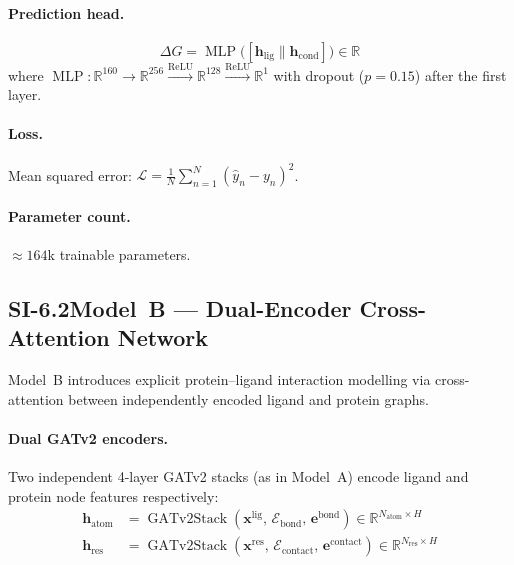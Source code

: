 \documentclass[11pt]{article}
\begin{document}
\paragraph{Prediction head.}
\begin{equation}
  \Delta G = \operatorname{MLP}\!\bigl(
    [\mathbf{h}_{\mathrm{lig}} \| \mathbf{h}_{\mathrm{cond}}]
  \bigr) \in \mathbb{R}
  \label{eq:pred_mlp}
\end{equation}
where $\operatorname{MLP}: \mathbb{R}^{160} \to
\mathbb{R}^{256} \xrightarrow{\mathrm{ReLU}}
\mathbb{R}^{128} \xrightarrow{\mathrm{ReLU}}
\mathbb{R}^{1}$ with dropout ($p = 0.15$) after the first layer.

\paragraph{Loss.} Mean squared error:
$\mathcal{L} = \frac{1}{N}\sum_{n=1}^{N}(\hat{y}_n - y_n)^2$.

\paragraph{Parameter count.} $\approx 164$k trainable parameters.

\subsection*{SI-6.2\quad Model~B --- Dual-Encoder Cross-Attention Network}
\label{si:model_b}

Model~B introduces explicit protein--ligand interaction modelling via
cross-attention between independently encoded ligand and protein graphs.

\paragraph{Dual GATv2 encoders.}
Two independent 4-layer GATv2 stacks (as in Model~A) encode ligand and
protein node features respectively:
\begin{align}
  \mathbf{h}_{\mathrm{atom}} &= \operatorname{GATv2Stack}(
    \mathbf{x}^{\mathrm{lig}},\, \mathcal{E}_{\mathrm{bond}},\,
    \mathbf{e}^{\mathrm{bond}})
    \in \mathbb{R}^{N_{\mathrm{atom}} \times H} \\
  \mathbf{h}_{\mathrm{res}} &= \operatorname{GATv2Stack}(
    \mathbf{x}^{\mathrm{res}},\, \mathcal{E}_{\mathrm{contact}},\,
    \mathbf{e}^{\mathrm{contact}})
    \in \mathbb{R}^{N_{\mathrm{res}} \times H}
\end{align}
\end{document}

